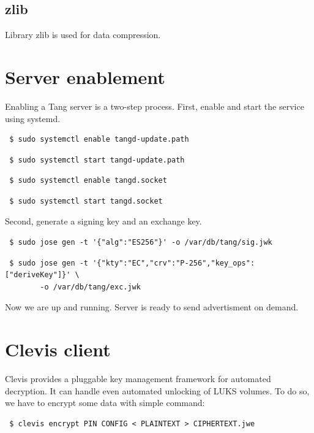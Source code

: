 \documentclass[../xdudla00-porting-Tang-to-Open-WRT.tex]{subfiles}
\begin{document}
\subsection{zlib}\label{zlib}
Library zlib \cite{zlib} is used for data compression.

\section{Server enablement}
Enabling a Tang server is a two-step process.
First, enable and start the service using systemd.

{\tt\begin{verbatim} $ sudo systemctl enable tangd-update.path\end{verbatim}
}

{\tt\begin{verbatim} $ sudo systemctl start tangd-update.path\end{verbatim}
}

{\tt\begin{verbatim} $ sudo systemctl enable tangd.socket\end{verbatim}
}

{\tt\begin{verbatim} $ sudo systemctl start tangd.socket\end{verbatim}
}

Second, generate a signing key and an exchange key.

{\tt\begin{verbatim} $ sudo jose gen -t '{"alg":"ES256"}' -o /var/db/tang/sig.jwk\end{verbatim}
}

{\tt\begin{verbatim} $ sudo jose gen -t '{"kty":"EC","crv":"P-256","key_ops":["deriveKey"]}' \
        -o /var/db/tang/exc.jwk\end{verbatim}
}

Now we are up and running. Server is ready to send advertisment on demand.
\todo{Get clevis in here?}


\section{Clevis client}\label{clevis}

Clevis provides a pluggable key management framework for automated decryption.
It can handle even automated unlocking of LUKS volumes.
To do so, we have to encrypt some data with simple command:

{\tt\begin{verbatim} $ clevis encrypt PIN CONFIG < PLAINTEXT > CIPHERTEXT.jwe\end{verbatim}
}
\end{document}
